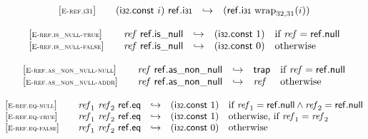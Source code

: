 $$
\begin{array}[t]{@{}lrcl@{}l@{}}
{[\textsc{\scriptsize E{-}ref.i31}]} \quad & (\mathsf{i{\scriptstyle 32}}{.}\mathsf{const}~i)~\mathsf{ref{.}i{\scriptstyle 31}} & \hookrightarrow & (\mathsf{ref{.}i{\scriptstyle 31}}~{{\mathrm{wrap}}}_{32, 31}(i)) \\
\end{array}
$$

\vspace{1ex}

$$
\begin{array}[t]{@{}lrcl@{}l@{}}
{[\textsc{\scriptsize E{-}ref.is\_null{-}true}]} \quad & {\mathit{ref}}~\mathsf{ref{.}is\_null} & \hookrightarrow & (\mathsf{i{\scriptstyle 32}}{.}\mathsf{const}~1) & \quad \mbox{if}~ {\mathit{ref}} = \mathsf{ref{.}null} \\
{[\textsc{\scriptsize E{-}ref.is\_null{-}false}]} \quad & {\mathit{ref}}~\mathsf{ref{.}is\_null} & \hookrightarrow & (\mathsf{i{\scriptstyle 32}}{.}\mathsf{const}~0) & \quad \mbox{otherwise} \\
\end{array}
$$

\vspace{1ex}

$$
\begin{array}[t]{@{}lrcl@{}l@{}}
{[\textsc{\scriptsize E{-}ref.as\_non\_null{-}null}]} \quad & {\mathit{ref}}~\mathsf{ref{.}as\_non\_null} & \hookrightarrow & \mathsf{trap} & \quad \mbox{if}~ {\mathit{ref}} = \mathsf{ref{.}null} \\
{[\textsc{\scriptsize E{-}ref.as\_non\_null{-}addr}]} \quad & {\mathit{ref}}~\mathsf{ref{.}as\_non\_null} & \hookrightarrow & {\mathit{ref}} & \quad \mbox{otherwise} \\
\end{array}
$$

\vspace{1ex}

$$
\begin{array}[t]{@{}lrcl@{}l@{}}
{[\textsc{\scriptsize E{-}ref.eq{-}null}]} \quad & {\mathit{ref}}_1~{\mathit{ref}}_2~\mathsf{ref{.}eq} & \hookrightarrow & (\mathsf{i{\scriptstyle 32}}{.}\mathsf{const}~1) & \quad \mbox{if}~ {\mathit{ref}}_1 = \mathsf{ref{.}null} \land {\mathit{ref}}_2 = \mathsf{ref{.}null} \\
{[\textsc{\scriptsize E{-}ref.eq{-}true}]} \quad & {\mathit{ref}}_1~{\mathit{ref}}_2~\mathsf{ref{.}eq} & \hookrightarrow & (\mathsf{i{\scriptstyle 32}}{.}\mathsf{const}~1) & \quad \mbox{otherwise, if}~ {\mathit{ref}}_1 = {\mathit{ref}}_2 \\
{[\textsc{\scriptsize E{-}ref.eq{-}false}]} \quad & {\mathit{ref}}_1~{\mathit{ref}}_2~\mathsf{ref{.}eq} & \hookrightarrow & (\mathsf{i{\scriptstyle 32}}{.}\mathsf{const}~0) & \quad \mbox{otherwise} \\
\end{array}
$$

